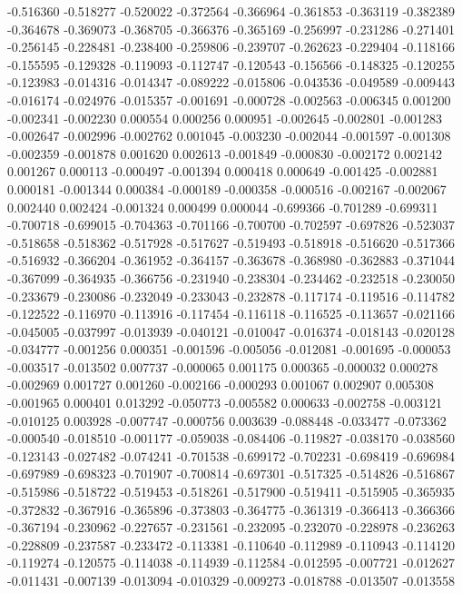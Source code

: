 -0.516360
-0.518277
-0.520022
-0.372564
-0.366964
-0.361853
-0.363119
-0.382389
-0.364678
-0.369073
-0.368705
-0.366376
-0.365169
-0.256997
-0.231286
-0.271401
-0.256145
-0.228481
-0.238400
-0.259806
-0.239707
-0.262623
-0.229404
-0.118166
-0.155595
-0.129328
-0.119093
-0.112747
-0.120543
-0.156566
-0.148325
-0.120255
-0.123983
-0.014316
-0.014347
-0.089222
-0.015806
-0.043536
-0.049589
-0.009443
-0.016174
-0.024976
-0.015357
-0.001691
-0.000728
-0.002563
-0.006345
0.001200
-0.002341
-0.002230
0.000554
0.000256
0.000951
-0.002645
-0.002801
-0.001283
-0.002647
-0.002996
-0.002762
0.001045
-0.003230
-0.002044
-0.001597
-0.001308
-0.002359
-0.001878
0.001620
0.002613
-0.001849
-0.000830
-0.002172
0.002142
0.001267
0.000113
-0.000497
-0.001394
0.000418
0.000649
-0.001425
-0.002881
0.000181
-0.001344
0.000384
-0.000189
-0.000358
-0.000516
-0.002167
-0.002067
0.002440
0.002424
-0.001324
0.000499
0.000044
-0.699366
-0.701289
-0.699311
-0.700718
-0.699015
-0.704363
-0.701166
-0.700700
-0.702597
-0.697826
-0.523037
-0.518658
-0.518362
-0.517928
-0.517627
-0.519493
-0.518918
-0.516620
-0.517366
-0.516932
-0.366204
-0.361952
-0.364157
-0.363678
-0.368980
-0.362883
-0.371044
-0.367099
-0.364935
-0.366756
-0.231940
-0.238304
-0.234462
-0.232518
-0.230050
-0.233679
-0.230086
-0.232049
-0.233043
-0.232878
-0.117174
-0.119516
-0.114782
-0.122522
-0.116970
-0.113916
-0.117454
-0.116118
-0.116525
-0.113657
-0.021166
-0.045005
-0.037997
-0.013939
-0.040121
-0.010047
-0.016374
-0.018143
-0.020128
-0.034777
-0.001256
0.000351
-0.001596
-0.005056
-0.012081
-0.001695
-0.000053
-0.003517
-0.013502
0.007737
-0.000065
0.001175
0.000365
-0.000032
0.000278
-0.002969
0.001727
0.001260
-0.002166
-0.000293
0.001067
0.002907
0.005308
-0.001965
0.000401
0.013292
-0.050773
-0.005582
0.000633
-0.002758
-0.003121
-0.010125
0.003928
-0.007747
-0.000756
0.003639
-0.088448
-0.033477
-0.073362
-0.000540
-0.018510
-0.001177
-0.059038
-0.084406
-0.119827
-0.038170
-0.038560
-0.123143
-0.027482
-0.074241
-0.701538
-0.699172
-0.702231
-0.698419
-0.696984
-0.697989
-0.698323
-0.701907
-0.700814
-0.697301
-0.517325
-0.514826
-0.516867
-0.515986
-0.518722
-0.519453
-0.518261
-0.517900
-0.519411
-0.515905
-0.365935
-0.372832
-0.367916
-0.365896
-0.373803
-0.364775
-0.361319
-0.366413
-0.366366
-0.367194
-0.230962
-0.227657
-0.231561
-0.232095
-0.232070
-0.228978
-0.236263
-0.228809
-0.237587
-0.233472
-0.113381
-0.110640
-0.112989
-0.110943
-0.114120
-0.119274
-0.120575
-0.114038
-0.114939
-0.112584
-0.012595
-0.007721
-0.012627
-0.011431
-0.007139
-0.013094
-0.010329
-0.009273
-0.018788
-0.013507
-0.013558
